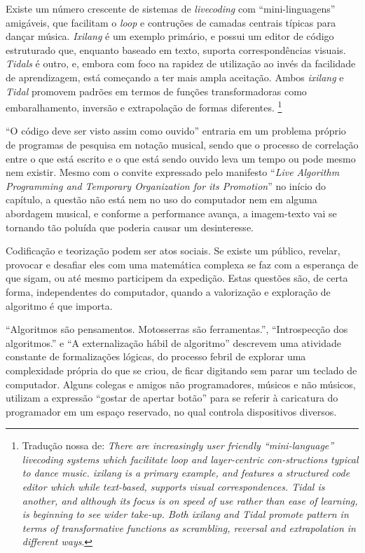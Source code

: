\begin{citacao}
Existe um número crescente de sistemas de \emph{livecoding} com ``mini-linguagens'' amigáveis, que facilitam o \emph{loop} e contruções de camadas centrais típicas para dançar música. \emph{Ixilang} é um exemplo primário, e possui um editor de código estruturado que, enquanto baseado em texto, suporta correspondências visuais. \emph{Tidals} é outro, e, embora com foco na rapidez de utilização ao invés da facilidade de aprendizagem, está começando a ter mais ampla aceitação. Ambos \emph{ixilang} e \emph{Tidal} promovem padrões em termos de funções transformadoras como embaralhamento, inversão e extrapolação de formas diferentes.  \cite[p~.357]{collins_algorave:_2014}\footnote{Tradução nossa de: \emph{There are increasingly user friendly “mini-language” livecoding systems which facilitate loop and layer-centric con-structions typical to dance music. ixilang is a primary example, and features a structured code editor which while text-based, supports visual correspondences. Tidal is another, and although its focus is on speed of use rather than ease of learning, is beginning to see wider take-up. Both ixilang and Tidal promote pattern in terms of transformative functions as scrambling, reversal and extrapolation in different ways}.}
\end{citacao}


``O código deve ser visto assim como ouvido'' entraria em um problema próprio de programas de pesquisa em notação musical, sendo que o processo de correlação entre o que está escrito e o que está sendo ouvido leva um tempo ou pode mesmo nem existir. Mesmo com o convite expressado pelo manifesto ``\emph{Live Algorithm Programming and Temporary Organization for its Promotion}'' no início do capítulo, a questão não está nem no uso do computador nem em alguma abordagem musical, e conforme a performance avança, a imagem-texto vai se tornando tão poluída que poderia causar um desinteresse.

\begin{citacao}
Codificação e teorização podem ser atos sociais. Se existe um público, revelar, provocar e desafiar eles com uma matemática complexa se faz com a esperança de que sigam, ou até mesmo participem da expedição. Estas questões são, de certa forma, independentes do computador, quando a valorização e exploração de algoritmo é que importa.\cite[p.~204]{ward_live_2004}
\end{citacao}

``Algoritmos são pensamentos. Motosserras são ferramentas.'', ``Introspecção dos algoritmos.'' e ``A externalização hábil de algoritmo'' descrevem uma atividade constante de formalizações lógicas, do processo febril de explorar uma complexidade própria do que se criou, de ficar digitando sem parar um teclado de computador. Alguns colegas e amigos não programadores, músicos e não músicos, utilizam a expressão ``gostar de apertar botão'' para se referir à caricatura do programador em um espaço reservado, no qual controla dispositivos diversos.


